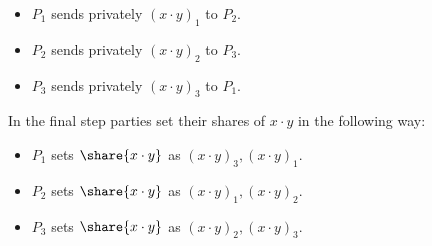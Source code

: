 \begin{itemize}
    \item $P_1$ sends privately $(x \cdot y)_1$ to $P_2$.
    \item $P_2$ sends privately $(x \cdot y)_2$ to $P_3$.
    \item $P_3$ sends privately $(x \cdot y)_3$ to $P_1$.
\end{itemize}

\noindent In the final step parties set their shares of $x \cdot y$ in the following way:
\begin{itemize}
    \item $P_1$ sets $\share{x \cdot y}$ as $(x\cdot y)_3, (x \cdot y)_1$.
    \item $P_2$ sets $\share{x \cdot y}$ as $(x\cdot y)_1, (x \cdot y)_2$.
    \item $P_3$ sets $\share{x \cdot y}$ as $(x\cdot y)_2, (x \cdot y)_3$.
\end{itemize}

